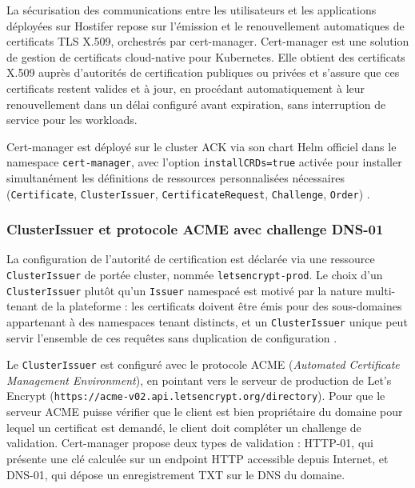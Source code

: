 La sécurisation des communications entre les utilisateurs et les applications déployées sur Hostifer repose sur l'émission et le renouvellement automatiques de certificats TLS X.509, orchestrés par cert-manager. Cert-manager est une solution de gestion de certificats cloud-native pour Kubernetes. Elle obtient des certificats X.509 auprès d'autorités de certification publiques ou privées et s'assure que ces certificats restent valides et à jour, en procédant automatiquement à leur renouvellement dans un délai configuré avant expiration, sans interruption de service pour les workloads. 

Cert-manager est déployé sur le cluster ACK via son chart Helm officiel dans le namespace \texttt{cert-manager}, avec l'option \texttt{installCRDs=true} activée pour installer simultanément les définitions de ressources personnalisées nécessaires (\texttt{Certificate}, \texttt{ClusterIssuer}, \texttt{CertificateRequest}, \texttt{Challenge}, \texttt{Order}) \cite{cert-manager-docs}.

\subsubsection*{ClusterIssuer et protocole ACME avec challenge DNS-01}

La configuration de l'autorité de certification est déclarée via une ressource \texttt{ClusterIssuer} de portée cluster, nommée \texttt{letsencrypt-prod}. Le choix d'un \texttt{ClusterIssuer} plutôt qu'un \texttt{Issuer} namespacé est motivé par la nature multi-tenant de la plateforme : les certificats doivent être émis pour des sous-domaines appartenant à des namespaces tenant distincts, et un \texttt{ClusterIssuer} unique peut servir l'ensemble de ces requêtes sans duplication de configuration \cite{cert-manager-acme}.

Le \texttt{ClusterIssuer} est configuré avec le protocole ACME (\textit{Automated Certificate Management Environment}), en pointant vers le serveur de production de Let's Encrypt (\texttt{https://acme-v02.api.letsencrypt.org/directory}). Pour que le serveur ACME puisse vérifier que le client est bien propriétaire du domaine pour lequel un certificat est demandé, le client doit compléter un challenge de validation. Cert-manager propose deux types de validation : HTTP-01, qui présente une clé calculée sur un endpoint HTTP accessible depuis Internet, et DNS-01, qui dépose un enregistrement TXT sur le DNS du domaine. 

